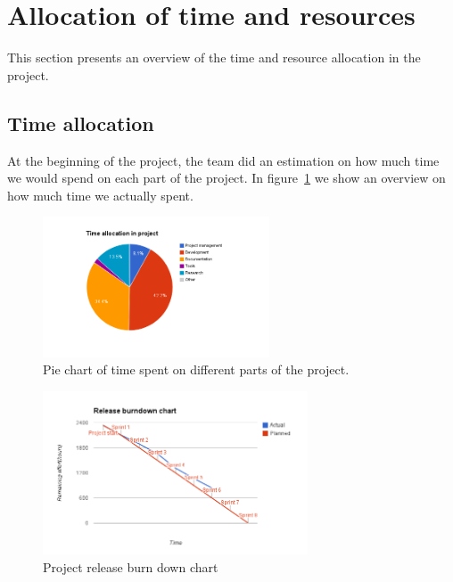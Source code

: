 \section{Allocation of time and resources}

This section presents an overview of the time and resource allocation in the project.

\subsection{Time allocation}
At the beginning of the project, the team did an estimation on how much time we would spend on each part of the project. In figure~\ref{fig:piechart} we show an overview on how much time we actually spent.

\begin{figure}[H]
\centering
\includegraphics[width=0.6\textwidth, clip, trim=4cm 2cm 4cm 1cm]{ch/retrospect/fig/timePie.png}
\caption{Pie chart of time spent on different parts of the project.}
\label{fig:piechart}
\end{figure}

\begin{figure}[H]
\centering
\includegraphics[width=0.7\textwidth, clip, trim=1.1cm 0.5cm 1.2cm 1cm]{ch/retrospect/fig/release.png}
\caption{Project release burn down chart}
\label{fig:release}
\end{figure}

